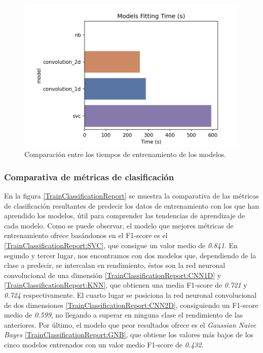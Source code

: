     \begin{figure}[h]
      \centering
      \includegraphics[width=12cm]{archivos/5.Resultados/TiemposEntrenamiento}
      \caption{Comparación entre los tiempos de entrenamiento de los modelos.}
      \label{TiemposEntrenamientoImage}
    \end{figure}


  \subsubsection{Comparativa de métricas de clasificación}

    En la figura \eqref{TrainClassificationReport} se muestra la comparativa de las métricas de clasificación resultantes de predecir los datos de entrenamiento con los que han aprendido los modelos, útil para comprender las tendencias de aprendizaje de cada modelo. Como se puede observar, el modelo que mejores métricas de entrenamiento ofrece basándonos en el F1-score es el  \eqref{TrainClassificationReport:SVC}, que consigue un valor medio de \textit{0.841}. En segundo y tercer lugar, nos encontramos con dos modelos que, dependiendo de la clase a predecir, se intercalan en rendimiento, éstos son la red neuronal convolucional de una dimensión \eqref{TrainClassificationReport:CNN1D} y  \eqref{TrainClassificationReport:KNN}, que obtienen una media F1-score de \textit {0.721} y \textit {0.724} respectivamente. El cuarto lugar se posiciona la red neuronal convolucional de dos dimensiones \eqref{TrainClassificationReport:CNN2D}, consiguiendo un F1-score medio de \textit{0.599}, no llegando a superar en ninguna clase el rendimiento de las anteriores. Por último, el modelo que peor resultados ofrece es el \textit{Gaussian Naive Bayes} \eqref{TrainClassificationReport:GNB}, que obtiene los valores más bajos de los cinco modelos entrenados con un valor medio F1-score de \textit{0.432}.

